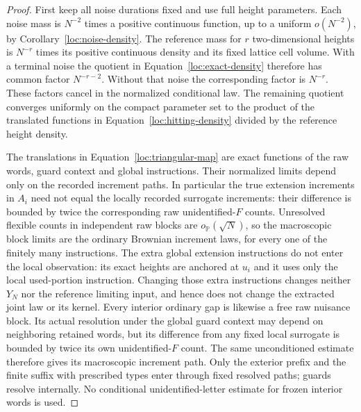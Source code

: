 \begin{proof}
First keep all noise durations fixed and use full height parameters.
Each noise mass is $N^{-2}$ times a positive continuous function, up to
a uniform $o(N^{-2})$, by Corollary~\ref{loc:noise-density}.  The
reference mass for $r$ two-dimensional heights is $N^{-r}$ times its
positive continuous density and its fixed lattice cell volume.  With a
terminal noise the quotient in
Equation~\eqref{loc:exact-density} therefore has common factor
$N^{-r-2}$.  Without that noise the corresponding factor is $N^{-r}$.
These factors cancel in the normalized conditional law.  The remaining
quotient converges uniformly on the compact parameter set to the product
of the translated functions in Equation~\eqref{loc:hitting-density}
divided by the reference height density.

The translations in Equation~\eqref{loc:triangular-map} are exact
functions of the raw words, guard context and global instructions.
Their normalized limits depend only on the recorded increment paths.
In particular the true extension increments in $A_i$ need not equal
the locally recorded surrogate increments: their difference is bounded
by twice the corresponding raw unidentified-$F$ counts.
Unresolved flexible counts in independent raw blocks are
$o_{\mathbb P}(\sqrt N)$, so the macroscopic block limits are the
ordinary Brownian increment laws, for every one of the finitely many
instructions.  The extra global extension instructions do not enter
the local observation: its exact heights are anchored at $u_i$ and it
uses only the local used-portion instruction.  Changing those extra
instructions changes neither $Y_N$ nor the reference limiting input,
and hence does not change the extracted joint law or its kernel.
Every interior ordinary gap is likewise a free raw nuisance block.
Its actual resolution under the global guard context may depend on
neighboring retained words, but its difference from any fixed local
surrogate is bounded by twice its own unidentified-$F$ count.  The same
unconditioned estimate therefore gives its macroscopic increment path.
Only the exterior prefix and the finite suffix with prescribed types
enter through fixed resolved paths; guards resolve internally.  No
conditional unidentified-letter estimate for frozen interior words is
used.


\end{proof}

